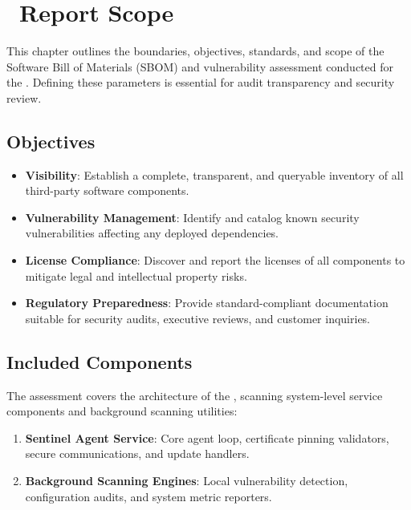 \chapter[Report Scope]{\IconScope\ Report Scope}

\noindent This chapter outlines the boundaries, objectives, standards, and scope of the Software Bill of Materials (SBOM) and vulnerability assessment conducted for the \ProjectName. Defining these parameters is essential for audit transparency and security review.

\section{Objectives}
\begin{itemize}
    \item \textbf{Visibility}: Establish a complete, transparent, and queryable inventory of all third-party software components.
    \item \textbf{Vulnerability Management}: Identify and catalog known security vulnerabilities affecting any deployed dependencies.
    \item \textbf{License Compliance}: Discover and report the licenses of all components to mitigate legal and intellectual property risks.
    \item \textbf{Regulatory Preparedness}: Provide standard-compliant documentation suitable for security audits, executive reviews, and customer inquiries.
\end{itemize}

\section{Included Components}
The assessment covers the architecture of the \ProjectName, scanning system-level service components and background scanning utilities:
\begin{enumerate}
    \item \textbf{Sentinel Agent Service}: Core agent loop, certificate pinning validators, secure communications, and update handlers.
    \item \textbf{Background Scanning Engines}: Local vulnerability detection, configuration audits, and system metric reporters.
\end{enumerate}

